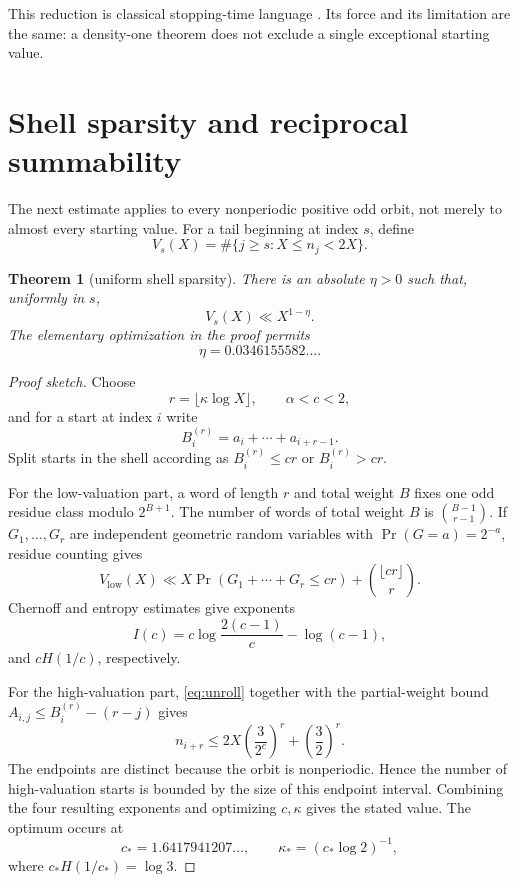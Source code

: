 \documentclass[11pt,reqno]{amsart}
\theoremstyle{plain}
\newtheorem{theorem}{Theorem}[section]
\theoremstyle{definition}
\newenvironment{proofsketch}
  {\begin{proof}[Proof sketch]}
  {\end{proof}}
\numberwithin{equation}{section}
\begin{document}
This reduction is classical stopping-time language \cite{terras1976}.  Its
force and its limitation are the same: a density-one theorem does not exclude
a single exceptional starting value.

\section{Shell sparsity and reciprocal summability}
\label{sec:shell}

The next estimate applies to every nonperiodic positive odd orbit, not merely
to almost every starting value.  For a tail beginning at index $s$, define
\[
V_s(X)=\#\{j\ge s:X\le n_j<2X\}.
\]

\begin{theorem}[uniform shell sparsity]
\label{thm:shell}
There is an absolute $\eta>0$ such that, uniformly in $s$,
\begin{equation}\label{eq:shell}
V_s(X)\ll X^{1-\eta}.
\end{equation}
The elementary optimization in the proof permits
\[
\eta=0.0346155582\ldots.
\]
\end{theorem}

\begin{proofsketch}
Choose
\[
r=\lfloor\kappa\log X\rfloor,
\qquad \alpha<c<2,
\]
and for a start at index $i$ write
\[
B_i^{(r)}=a_i+\cdots+a_{i+r-1}.
\]
Split starts in the shell according as $B_i^{(r)}\le cr$ or $B_i^{(r)}>cr$.

For the low-valuation part, a word of length $r$ and total weight $B$ fixes one
odd residue class modulo $2^{B+1}$.  The number of words of total weight $B$
is $\binom{B-1}{r-1}$.  If $G_1,\ldots,G_r$ are independent geometric random
variables with $\Pr(G=a)=2^{-a}$, residue counting gives
\[
V_{\mathrm{low}}(X)
\ll X\Pr(G_1+\cdots+G_r\le cr)+\binom{\lfloor cr\rfloor}{r}.
\]
Chernoff and entropy estimates give exponents
\[
I(c)=c\log\!\frac{2(c-1)}c-\log(c-1),
\]
and $cH(1/c)$, respectively.

For the high-valuation part, \eqref{eq:unroll} together with the
partial-weight bound $A_{i,j}\le B_i^{(r)}-(r-j)$ gives
\[
n_{i+r}
\le 2X\left(\frac{3}{2^c}\right)^r
+\left(\frac32\right)^r.
\]
The endpoints are distinct because the orbit is nonperiodic.  Hence the
number of high-valuation starts is bounded by the size of this endpoint
interval.  Combining the four resulting exponents and optimizing $c,\kappa$
gives the stated value.  The optimum occurs at
\[
c_*=1.6417941207\ldots,
\qquad
\kappa_*=(c_*\log2)^{-1},
\]
where $c_*H(1/c_*)=\log3$.
\end{proofsketch}
\end{document}
